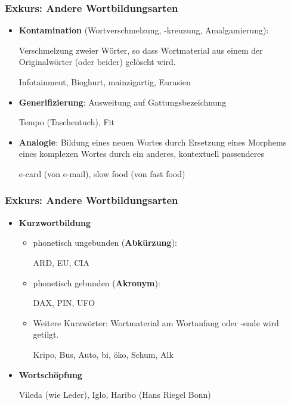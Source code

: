 \begin{frame}
\frametitle{Exkurs: Andere Wortbildungsarten}

\begin{itemize}
	\item \textbf{Kontamination} (Wortverschmelzung, -kreuzung, Amalgamierung):

	Verschmelzung zweier Wörter, so dass Wortmaterial aus einem der Originalwörter (oder beider) gelöscht wird.
		
	\ea Infotainment, Bioghurt, mainzigartig, Eurasien
	\z
	
	\item \textbf{Generifizierung}: Ausweitung auf Gattungsbezeichnung
	
	\ea Tempo (Taschentuch), Fit
	\z
	
	\item \textbf{Analogie}: Bildung eines neuen Wortes durch Ersetzung eines Morphems eines komplexen Wortes durch ein anderes, kontextuell passenderes
	
	\ea e-card (von e-mail), slow food (von fast food)
	\z
	
\end{itemize}

\end{frame}


\begin{frame}
\frametitle{Exkurs: Andere Wortbildungsarten}

\begin{itemize}
\item \textbf{Kurzwortbildung}

\begin{itemize}
	\item phonetisch ungebunden (\textbf{Abkürzung}):
	
	\ea ARD, EU, CIA
	\z
	
	\item phonetisch gebunden (\textbf{Akronym}):
	
	\ea DAX, PIN, UFO
	\z

	\item Weitere Kurzwörter: Wortmaterial am Wortanfang oder -ende wird getilgt.
	
	\ea Kripo, Bus, Auto, bi, öko, Schum, Alk
	\z
	
\end{itemize}


\item \textbf{Wortschöpfung}

\ea Vileda (wie Leder), Iglo, Haribo (Hans Riegel Bonn)
\z

\end{itemize}

\end{frame}


